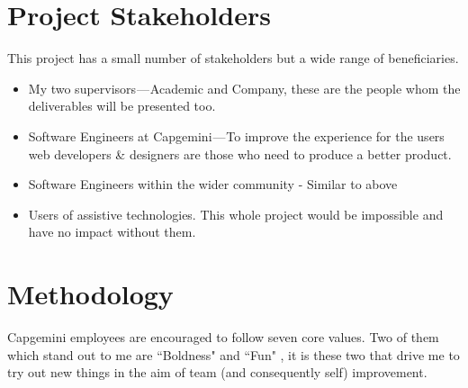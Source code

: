 \section{Project Stakeholders}
This project has a small number of stakeholders but a wide range of beneficiaries.
\begin{itemize}
  \item My two supervisors — Academic and Company, these are the people whom
  the deliverables will be presented too.
  \item Software Engineers at Capgemini — To improve the experience for the
  users web developers \& designers are those who need to produce a better
  product.
  \item Software Engineers within the wider community - Similar to above
  \item Users of assistive technologies. This whole project would be
    impossible and have no impact without them.
\end{itemize}

\section{Methodology}
Capgemini employees are encouraged to follow seven core values. Two of them
which stand out to me are ``Boldness" and ``Fun" \cite{CapValues}, it is these
two that drive me to try out new things in the aim of team (and consequently
self) improvement.

